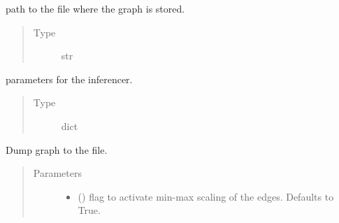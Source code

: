 \documentclass[letterpaper,10pt,english]{sphinxmanual}
\begin{document}
\begin{fulllineitems}

\begin{fulllineitems}
\label{\detokenize{_modules/cosifer.handlers:cosifer.handlers.network_handler.NetworkHandler.filepath}}
path to the file where the graph is stored.
\begin{quote}\begin{description}
\item[{Type}] \leavevmode
str

\end{description}\end{quote}

\end{fulllineitems}


\begin{fulllineitems}
\label{\detokenize{_modules/cosifer.handlers:cosifer.handlers.network_handler.NetworkHandler.parameters}}
parameters for the inferencer.
\begin{quote}\begin{description}
\item[{Type}] \leavevmode
dict

\end{description}\end{quote}

\end{fulllineitems}


\begin{fulllineitems}
\label{\detokenize{_modules/cosifer.handlers:cosifer.handlers.network_handler.NetworkHandler.dump}}
Dump graph to the file.
\begin{quote}\begin{description}
\item[{Parameters}] \leavevmode\begin{itemize}
\item {} 
 (\sphinxstyleliteralemphasis{\sphinxupquote{, }}) \textendash{} flag to activate min-max scaling of the
edges. Defaults to True.


\end{itemize}
\end{description}
\end{quote}
\end{fulllineitems}
\end{fulllineitems}
\end{document}

